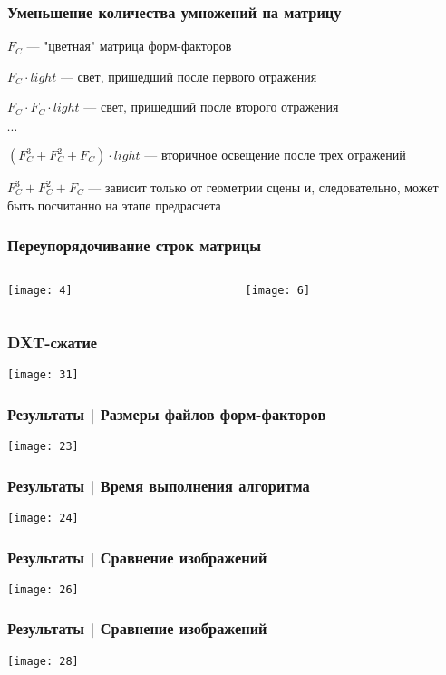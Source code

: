 \documentclass[unicode, dvipsnames]{beamer}
\begin{document}
\begin{frame}
	\frametitle{Уменьшение количества умножений на матрицу}
	$F_C$ --- "цветная" матрица форм-факторов
	
	$F_C \cdot light$ --- свет, пришедший после первого отражения

	$F_C \cdot F_C \cdot light$ --- свет, пришедший после второго отражения
	
	$\cdots$
	
	$(F_C^3 + F_C^2 + F_C) \cdot light$ --- вторичное освещение после трех отражений
	
	$F_C^3 + F_C^2 + F_C$ --- зависит только от геометрии сцены и, следовательно, может быть посчитанно на этапе предрасчета
\end{frame}

\begin{frame}
	\frametitle{Переупорядочивание строк матрицы}
	\begin{columns}[T]
    	\begin{column}[T]{5cm}
			\texttt{[image: 4]}
    	\end{column}
    	\begin{column}[T]{5cm}
			\texttt{[image: 6]}
	    \end{column}
    \end{columns}
\end{frame}

\begin{frame}
	\frametitle{DXT-сжатие}
	\texttt{[image: 31]}
\end{frame}

\begin{frame}
	\frametitle{Результаты | Размеры файлов форм-факторов}
	\texttt{[image: 23]}
\end{frame}

\begin{frame}
	\frametitle{Результаты | Время выполнения алгоритма}
	\texttt{[image: 24]}
\end{frame}

\begin{frame}
	\frametitle{Результаты | Сравнение изображений}
	\center
	\texttt{[image: 26]}
\end{frame}

\begin{frame}
	\frametitle{Результаты | Сравнение изображений}
	\center
	\texttt{[image: 28]}
\end{frame}
\end{document}

